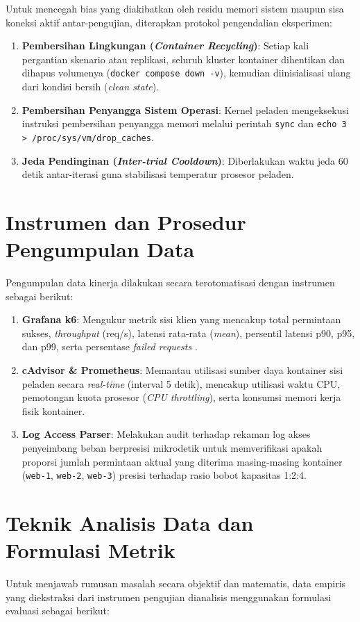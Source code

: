 Untuk mencegah bias yang diakibatkan oleh residu memori sistem maupun sisa koneksi aktif antar-pengujian, diterapkan protokol pengendalian eksperimen:
\begin{enumerate}
    \item \textbf{Pembersihan Lingkungan (\textit{Container Recycling})}: Setiap kali pergantian skenario atau replikasi, seluruh kluster kontainer dihentikan dan dihapus volumenya (\texttt{docker compose down -v}), kemudian diinisialisasi ulang dari kondisi bersih (\textit{clean state}).
    \item \textbf{Pembersihan Penyangga Sistem Operasi}: Kernel peladen mengeksekusi instruksi pembersihan penyangga memori melalui perintah \texttt{sync} dan \texttt{echo 3 > /proc/sys/vm/drop\_caches}.
    \item \textbf{Jeda Pendinginan (\textit{Inter-trial Cooldown})}: Diberlakukan waktu jeda 60 detik antar-iterasi guna stabilisasi temperatur prosesor peladen.
\end{enumerate}

\section{Instrumen dan Prosedur Pengumpulan Data}
Pengumpulan data kinerja dilakukan secara terotomatisasi dengan instrumen sebagai berikut:
\begin{enumerate}
    \item \textbf{Grafana k6}: Mengukur metrik sisi klien yang mencakup total permintaan sukses, \textit{throughput} (req/s), latensi rata-rata (\textit{mean}), persentil latensi p90, p95, dan p99, serta persentase \textit{failed requests} \citep{k6docs2024}.
    \item \textbf{cAdvisor \& Prometheus}: Memantau utilisasi sumber daya kontainer sisi peladen secara \textit{real-time} (interval 5 detik), mencakup utilisasi waktu CPU, pemotongan kuota prosesor (\textit{CPU throttling}), serta konsumsi memori kerja fisik kontainer.
    \item \textbf{Log Access Parser}: Melakukan audit terhadap rekaman log akses penyeimbang beban berpresisi mikrodetik untuk memverifikasi apakah proporsi jumlah permintaan aktual yang diterima masing-masing kontainer (\texttt{web-1}, \texttt{web-2}, \texttt{web-3}) presisi terhadap rasio bobot kapasitas 1:2:4.
\end{enumerate}

\section{Teknik Analisis Data dan Formulasi Metrik}
Untuk menjawab rumusan masalah secara objektif dan matematis, data empiris yang diekstraksi dari instrumen pengujian dianalisis menggunakan formulasi evaluasi sebagai berikut:

